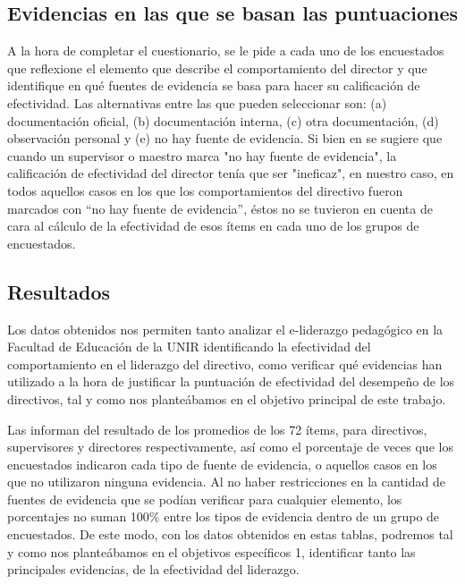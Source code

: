 \documentclass[spanish]{textolivre}
\begin{document}
\subsection{Evidencias en las que se basan las puntuaciones}
A la hora de completar el cuestionario, se le pide a cada uno de los encuestados que reflexione el elemento que describe el comportamiento del director y que identifique en qué fuentes de evidencia se basa para hacer su calificación de efectividad. Las alternativas entre las que pueden seleccionar son: (a) documentación oficial, (b) documentación interna, (c) otra documentación, (d) observación personal y (e) no hay fuente de evidencia. Si bien en \textcite{vanderperformance} se sugiere que cuando un supervisor o maestro marca "no hay fuente de evidencia", la calificación de efectividad del director tenía que ser "ineficaz", en nuestro caso, en todos aquellos casos en los que los comportamientos del directivo fueron marcados con “no hay fuente de evidencia”, éstos no se tuvieron en cuenta de cara al cálculo de la efectividad de esos ítems en cada uno de los grupos de encuestados.

\subsection{Resultados}
Los datos obtenidos nos permiten tanto analizar el e-liderazgo pedagógico en la Facultad de Educación de la UNIR identificando la efectividad del comportamiento en el liderazgo del directivo, como verificar qué evidencias han utilizado a la hora de justificar la puntuación de efectividad del desempeño de los directivos, tal y como nos planteábamos en el objetivo principal de este trabajo.

Las  informan del resultado de los promedios de los 72 ítems, para directivos, supervisores y directores respectivamente, así como el porcentaje de veces que los encuestados indicaron cada tipo de fuente de evidencia, o aquellos casos en los que no utilizaron ninguna evidencia. Al no haber restricciones en la cantidad de fuentes de evidencia que se podían verificar para cualquier elemento, los porcentajes no suman 100\% entre los tipos de evidencia dentro de un grupo de encuestados. De este modo, con los datos obtenidos en estas tablas, podremos tal y como nos planteábamos en el objetivos específicos 1, identificar tanto las principales evidencias, de la efectividad del liderazgo. 
\end{document}

